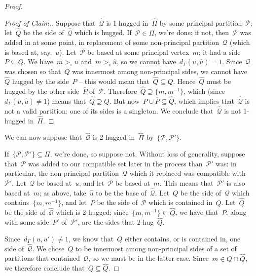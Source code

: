 \documentclass[11pt]{amsart}
\theoremstyle{definition}
\theoremstyle{definition}
\theoremstyle{definition}
\theoremstyle{definition}
\newcommand{\calQ}{\mathcal{Q}}
\newcommand{\calP}{\mathcal{P}} %
\begin{document}
\begin{proof}
    \begin{proof}[Proof of Claim.]
        Suppose that~$\widehat{\calQ}$ is 1-hugged in~$\widehat{\Pi}$ by some principal partition~$\calP$; let~$\widehat{Q}$ be the side of~$\widehat{\calQ}$ which is hugged. If~$\calP \in \Pi$, we're done; if not, then~$\calP$ was added in at some point, in replacement of some non-principal partition~$\calQ$ (which is based at, say,~$u$). Let~$\calP$ be based at some principal vertex~$m$; it had a side~$P \subseteq Q$. We have~$m >_\circ u$ and~$m >_\circ \widehat{u}$, so we cannot have~$d_\Gamma(u, \widehat{u}) = 1$. Since~$\calQ$ was chosen so that~$Q$ was innermost among non-principal sides, we cannot have~$\widehat{Q}$ hugged by the side~$P$ -- this would mean that~$\widehat{Q} \subseteq Q$. Hence~$\widehat{Q}$ must be hugged by the other side~$\overline{P}$ of~$\calP$. Therefore~$\widehat{Q} \supseteq \{m, m^{-1}\}$, which (since~$d_\Gamma(u, \widehat{u}) \neq 1$) means that~$\widehat{Q} \supseteq Q$. But now~$P \cup \overline{P} \subseteq \widehat{Q}$, which implies that~$\widehat{\calQ}$ is not a valid partition: one of its sides is a singleton. We conclude that~$\widehat{\calQ}$ is not 1-hugged in~$\widehat{\Pi}$. 
    \end{proof}
    
    We can now suppose that~$\widehat{\calQ}$ is 2-hugged in~$\widehat{\Pi}$ by~$\{\calP, \calP'\}$.
    
    If~$\{\calP, \calP'\} \subseteq \Pi$, we're done, so suppose not. Without loss of generality, suppose that~$\calP$ was added to our compatible set later in the process than~$\calP'$ was: in particular, the non-principal partition~$\calQ$ which it replaced was compatible with~$\calP'$. Let~$\calQ$ be based at~$u$, and let~$\calP$ be based at~$m$. This means that~$\calP'$ is also based at~$m$; as above, take~$\widehat{u}$ to be the base of~$\widehat{\calQ}$. Let~$Q$ be the side of~$\calQ$ which contains~$\{m, m^{-1}\}$, and let~$P$ be the side of~$\calP$ which is contained in~$Q$. Let~$\widehat{Q}$ be the side of~$\widehat{\calQ}$ which is 2-hugged; since~$\{m, m^{-1}\} \subseteq \widehat{Q}$, we have that~$P$, along with some side~$P'$ of~$\calP'$, are the sides that 2-hug~$\widehat{Q}$.

    Since~$d_\Gamma(u, u') \neq 1$, we know that~$Q$ either contains, or is contained in, one side of~$\widehat{\calQ}$. We chose~$Q$ to be innermost among non-principal sides of a set of partitions that contained~$\widehat{\calQ}$, so we must be in the latter case. Since~$m \in Q \cap \widehat{Q}$, we therefore conclude that~$Q \subseteq \widehat{Q}$.


\end{proof}
\end{document}
